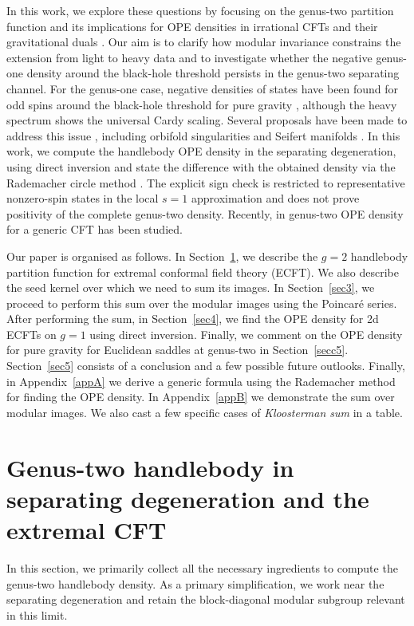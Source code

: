 \documentclass[12 pt]{article}
\begin{document}
In this work, we explore these questions by focusing on the genus-two partition function \cite{Yin:2007gv} and its implications for OPE densities in irrational CFTs and their gravitational duals \cite{Alday:2019vdr}. Our aim is to clarify how modular invariance constrains the extension from light to heavy data and to investigate whether the negative genus-one density around the black-hole threshold persists in the genus-two separating channel. For the genus-one case, negative densities of states have been found for odd spins around the black-hole threshold for pure gravity \cite{Alday:2019vdr,Alday:2020qkm}, although the heavy spectrum shows the universal Cardy scaling. Several proposals have been made to address this issue \cite{Alday:2019vdr,Alday:2020qkm,Bae:2016yna,Benjamin:2020mfz}, including orbifold singularities and Seifert manifolds \cite{Yan:2025usw}. In this work, we compute the handlebody OPE density in the separating degeneration, using direct inversion and state the difference with the obtained density via the Rademacher circle method \cite{LopesCardoso:2021aem,Baccianti:2025gll,Alday:2019vdr}. The explicit sign check is restricted to representative nonzero-spin states in the local $s=1$ approximation and does not prove positivity of the complete genus-two density. Recently, in \cite{Simmons-Duffin:2025qox} genus-two OPE density for a generic CFT has been studied.\\ \par
\noindent
Our paper is organised as follows. In Section~\ref{sec2}, we describe the $g=2$ handlebody partition function for extremal conformal field theory (ECFT). We also describe the seed kernel over which we need to sum its images. In Section~\ref{sec3}, we proceed to perform this sum over the modular images using the Poincaré series. After performing the sum, in Section~\ref{sec4}, we find the OPE density for 2d ECFTs on $g=1$ using direct inversion.  Finally, we comment on the  OPE density for pure gravity for Euclidean saddles at genus-two in Section~\ref{secc5}. Section~\ref{sec5} consists of a conclusion and a few possible future outlooks. Finally, in Appendix~\ref{appA} we derive a generic formula using the Rademacher method for finding the OPE density. In Appendix~\ref{appB} we demonstrate the sum over modular images. We also cast a few specific cases of \textit{Kloosterman sum} in a table.
\section{Genus-two handlebody in separating degeneration and the extremal CFT}\label{sec2}
In this section, we primarily collect all the necessary ingredients to compute the genus-two handlebody density. As a primary simplification, we work near the separating degeneration and retain the block-diagonal modular subgroup relevant in this limit.
\end{document}
